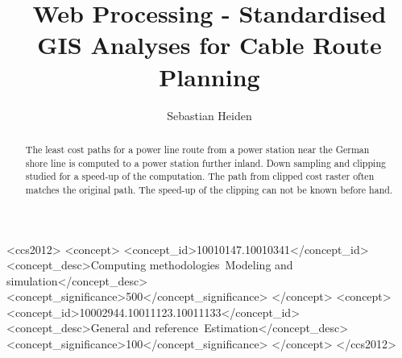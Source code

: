 \documentclass[acmtog]{acmart}
\begin{document}
	\title{Web Processing - Standardised GIS Analyses for Cable Route Planning}
	
	\author{Sebastian Heiden}
	
	
	\renewcommand{\shortauthors}{Heiden}
	
	\begin{abstract}
		The least cost paths for a power line route from a power station near the German shore line is computed to a power station further inland.
		Down sampling and clipping studied for a speed-up of the computation.
		The path from clipped cost raster often matches the original path.
		The speed-up of the clipping can not be known before hand.
	\end{abstract}
	
	\begin{CCSXML}
		<ccs2012>
		<concept>
		<concept_id>10010147.10010341</concept_id>
		<concept_desc>Computing methodologies~Modeling and simulation</concept_desc>
		<concept_significance>500</concept_significance>
		</concept>
		<concept>
		<concept_id>10002944.10011123.10011133</concept_id>
		<concept_desc>General and reference~Estimation</concept_desc>
		<concept_significance>100</concept_significance>
		</concept>
		</ccs2012>
	\end{CCSXML}
	


	
	
	
	\maketitle
	
\end{document}
